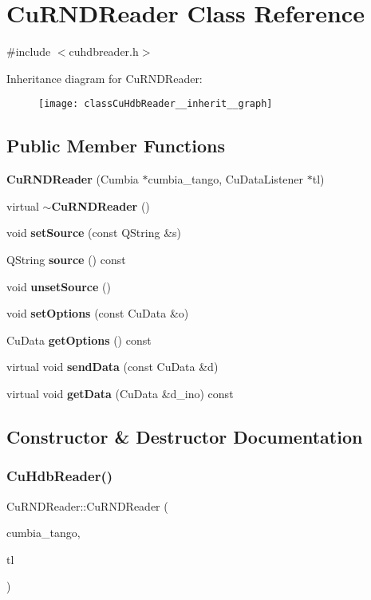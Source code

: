 \section{Cu\+R\+N\+D\+Reader Class Reference}
\label{classCuHdbReader}


{\ttfamily \#include $<$cuhdbreader.\+h$>$}



Inheritance diagram for Cu\+R\+N\+D\+Reader\+:
\nopagebreak
\begin{figure}[H]
\begin{center}
\leavevmode
\texttt{[image: classCuHdbReader\_\_inherit\_\_graph]}
\end{center}
\end{figure}
\subsection*{Public Member Functions}
\begin{DoxyCompactItemize}
\item 
\textbf{ Cu\+R\+N\+D\+Reader} (Cumbia $\ast$cumbia\+\_\+tango, Cu\+Data\+Listener $\ast$tl)
\item 
virtual \textbf{ $\sim$\+Cu\+R\+N\+D\+Reader} ()
\item 
void \textbf{ set\+Source} (const Q\+String \&s)
\item 
Q\+String \textbf{ source} () const
\item 
void \textbf{ unset\+Source} ()
\item 
void \textbf{ set\+Options} (const Cu\+Data \&o)
\item 
Cu\+Data \textbf{ get\+Options} () const
\item 
virtual void \textbf{ send\+Data} (const Cu\+Data \&d)
\item 
virtual void \textbf{ get\+Data} (Cu\+Data \&d\+\_\+ino) const
\end{DoxyCompactItemize}


\subsection{Constructor \& Destructor Documentation}
\mbox{\label{classCuHdbReader_a34a393bacb34247e782067bf1ab2cd1f}} 
\subsubsection{CuHdbReader()}
{\footnotesize\ttfamily Cu\+R\+N\+D\+Reader\+::\+Cu\+R\+N\+D\+Reader (\begin{DoxyParamCaption}\item[{Cumbia $\ast$}]{cumbia\+\_\+tango,  }\item[{Cu\+Data\+Listener $\ast$}]{tl }\end{DoxyParamCaption})}



